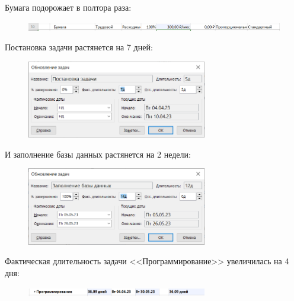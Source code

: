 Бумага подорожает в полтора раза:

\begin{figure}[H]
	\begin{center}
		\includegraphics[width=\textwidth]{imgs/task_10_2.png}
	\end{center}
\end{figure}

Постановка задачи растянется на 7 дней:

\begin{figure}[H]
	\begin{center}
		\includegraphics[width=0.7\textwidth]{imgs/task_10_3.png}
	\end{center}
\end{figure}

И заполнение базы данных растянется на 2 недели:

\begin{figure}[H]
	\begin{center}
		\includegraphics[width=0.7\textwidth]{imgs/task_10_4.png}
	\end{center}
\end{figure}

Фактическая длительность задачи <<Программирование>> увеличилась на 4 дня:

\begin{figure}[H]
	\begin{center}
		\includegraphics[width=0.7\textwidth]{imgs/task_10_5.png}
	\end{center}
\end{figure}

